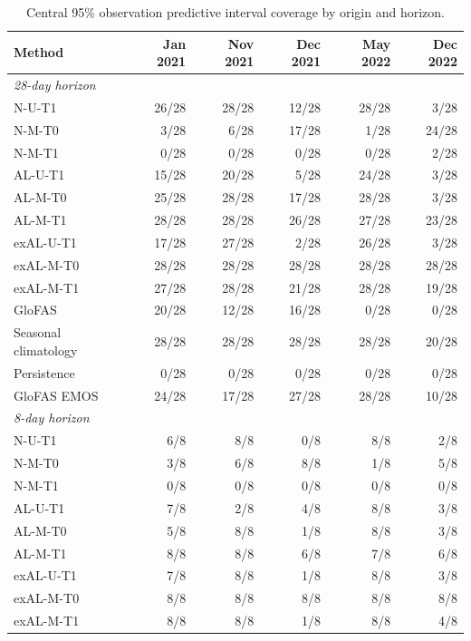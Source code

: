 \begin{table}[!htbp]
\centering
\begin{threeparttable}
\caption{Central 95\% observation predictive interval coverage by origin and horizon.}
\label{tab:origin_interval_coverage}
\setlength{\tabcolsep}{4pt}
\begin{tabular}{lrrrrr}
\hline
Method & Jan 2021 & Nov 2021 & Dec 2021 & May 2022 & Dec 2022 \\
\hline
\multicolumn{6}{l}{\textit{28-day horizon}} \\
N-U-T1 & 26/28 & 28/28 & 12/28 & 28/28 & 3/28 \\
N-M-T0 & 3/28 & 6/28 & 17/28 & 1/28 & 24/28 \\
N-M-T1 & 0/28 & 0/28 & 0/28 & 0/28 & 2/28 \\
AL-U-T1 & 15/28 & 20/28 & 5/28 & 24/28 & 3/28 \\
AL-M-T0 & 25/28 & 28/28 & 17/28 & 28/28 & 3/28 \\
AL-M-T1 & 28/28 & 28/28 & 26/28 & 27/28 & 23/28 \\
exAL-U-T1 & 17/28 & 27/28 & 2/28 & 26/28 & 3/28 \\
exAL-M-T0 & 28/28 & 28/28 & 28/28 & 28/28 & 28/28 \\
exAL-M-T1 & 27/28 & 28/28 & 21/28 & 28/28 & 19/28 \\
GloFAS & 20/28 & 12/28 & 16/28 & 0/28 & 0/28 \\
Seasonal climatology & 28/28 & 28/28 & 28/28 & 28/28 & 20/28 \\
Persistence & 0/28 & 0/28 & 0/28 & 0/28 & 0/28 \\
GloFAS EMOS & 24/28 & 17/28 & 27/28 & 28/28 & 10/28 \\
\hline
\multicolumn{6}{l}{\textit{8-day horizon}} \\
N-U-T1 & 6/8 & 8/8 & 0/8 & 8/8 & 2/8 \\
N-M-T0 & 3/8 & 6/8 & 8/8 & 1/8 & 5/8 \\
N-M-T1 & 0/8 & 0/8 & 0/8 & 0/8 & 0/8 \\
AL-U-T1 & 7/8 & 2/8 & 4/8 & 8/8 & 3/8 \\
AL-M-T0 & 5/8 & 8/8 & 1/8 & 8/8 & 3/8 \\
AL-M-T1 & 8/8 & 8/8 & 6/8 & 7/8 & 6/8 \\
exAL-U-T1 & 7/8 & 8/8 & 1/8 & 8/8 & 3/8 \\
exAL-M-T0 & 8/8 & 8/8 & 8/8 & 8/8 & 8/8 \\
exAL-M-T1 & 8/8 & 8/8 & 1/8 & 8/8 & 4/8 \\

\end{tabular}
\end{threeparttable}
\end{table}
